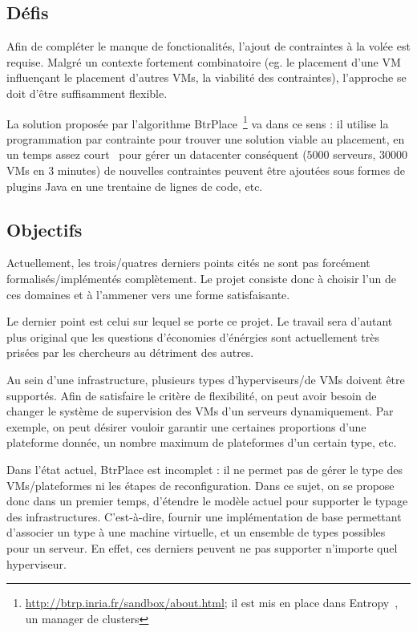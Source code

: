 \documentclass[a4paper]{article}
\begin{document}
\subsection{Défis}
Afin de compléter le manque de fonctionalités, l'ajout de contraintes à
la volée est requise. Malgré un contexte fortement combinatoire (eg.
le placement d'une VM influençant le placement d'autres VMs, la viabilité
des contraintes), l'approche se doit d'être suffisamment flexible.

La solution proposée par l'algorithme BtrPlace~\footnote{\url{http://btrp.inria.fr/sandbox/about.html};
il est mis en place dans Entropy~\cite{herm2009}, un manager de clusters}
va dans ce sens : il utilise la programmation
par contrainte pour trouver une solution viable au placement, en un temps
assez \og court \fg\ pour gérer un datacenter conséquent ($5000$ serveurs, $30000$
VMs en $3$ minutes) de nouvelles contraintes peuvent être ajoutées sous
formes de plugins Java en une trentaine de lignes de code, etc.

\subsection{Objectifs}
Actuellement, les trois/quatres derniers points cités ne sont pas forcément
formalisés/implémentés complètement. Le projet consiste donc à choisir l'un
de ces domaines et à l'ammener vers une forme satisfaisante.

Le dernier point est celui sur lequel se porte ce projet. Le travail sera
d'autant plus original que les questions d'économies d'énérgies sont actuellement
très prisées par les chercheurs au détriment des autres.

Au sein d'une infrastructure, plusieurs types d'hyperviseurs/de VMs doivent
être supportés. Afin de satisfaire le critère de flexibilité, on peut avoir
besoin de changer le système de supervision des VMs d'un serveurs dynamiquement.
Par exemple, on peut désirer vouloir garantir une certaines proportions
d'une plateforme donnée, un nombre maximum de plateformes d'un certain type, etc.

Dans l'état actuel, BtrPlace est incomplet : il ne permet pas de gérer le type
des VMs/plateformes ni les étapes de reconfiguration. Dans ce sujet,  on
se propose donc dans un premier temps, d'étendre le modèle actuel
pour supporter le typage des infrastructures. C'est-à-dire, fournir
une implémentation de base permettant d'associer un type à une machine
virtuelle, et un ensemble de types possibles pour un serveur. En effet,
ces derniers peuvent ne pas supporter n'importe quel hyperviseur.
\end{document}
